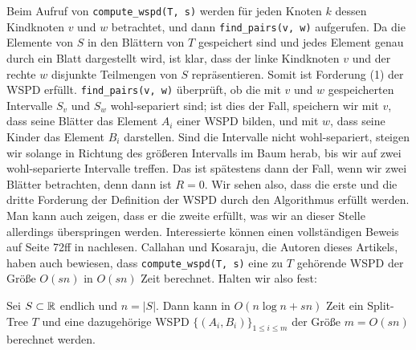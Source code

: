 Beim Aufruf von \texttt{compute\_wspd(T, s)} werden für jeden Knoten $k$ dessen Kindknoten $v$ und $w$ betrachtet, und dann \texttt{find\_pairs(v, w)} aufgerufen. 
Da die Elemente von $S$ in den Blättern von $T$ gespeichert sind und jedes Element genau durch ein Blatt dargestellt wird, ist klar, dass der linke Kindknoten $v$ und der rechte $w$ disjunkte Teilmengen von $S$ repräsentieren. 
Somit ist Forderung (1) der WSPD erfüllt. \texttt{find\_pairs(v, w)} überprüft, ob die mit $v$ und $w$ gespeicherten Intervalle $S_v$ und $S_w$ wohl-separiert sind; ist dies der Fall, speichern wir mit $v$, dass seine Blätter das Element $A_i$ einer WSPD bilden, und mit $w$, dass seine Kinder das Element $B_i$ darstellen. 
Sind die Intervalle nicht wohl-separiert, steigen wir solange in Richtung des größeren Intervalls im Baum herab, bis wir auf zwei wohl-separierte Intervalle treffen. 
Das ist spätestens dann der Fall, wenn wir zwei Blätter betrachten, denn dann ist $R = 0$.
Wir sehen also, dass die erste und die dritte Forderung der Definition der WSPD durch den Algorithmus erfüllt werden. 
Man kann auch zeigen, dass er die zweite erfüllt, was wir an dieser Stelle allerdings überspringen werden. 
Interessierte können einen vollständigen Beweis auf Seite 72ff in \cite{callahan} nachlesen. Callahan und Kosaraju, die Autoren dieses Artikels, haben auch bewiesen, dass \texttt{compute\_wspd(T, s)} eine zu $T$ gehörende WSPD der Größe $O(sn)$ in $O(sn)$ Zeit berechnet. 
Halten wir also fest:
\begin{theorem}
	\label{theo:wspdtime}
	Sei $S \subset \mathbb{R}$ endlich und $n = |S|$. Dann kann in $O(n \log n + sn)$ Zeit ein Split-Tree $T$ und eine dazugehörige WSPD $\{(A_i, B_i)\}_{1 \leq i \leq m}$ der Größe $m = O(sn)$ berechnet werden.
\end{theorem}